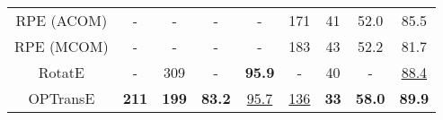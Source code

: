 \documentclass[11pt,a4paper]{article}
\begin{document}
\begin{table*}[t]
\begin{tabular}{|c|c|c|c|c|c|c|c|c|}
RPE (ACOM)                                       & -         & -             & -         & -             & 171         & 41             & 52.0         & 85.5             \\
RPE (MCOM)                                       & -         & -             & -         & -             & 183         & 43             & 52.2         & 81.7             \\
RotatE      & -         & 309             & -         & \bf95.9  
& -         & 40             & -         & \underline{88.4}                                \\
\hline
OPTransE                                   & \bf211         & \bf199             & \bf83.2         & \underline{95.7}             & \underline{136}         & \bf33              & \bf58.0         & \bf89.9            \\
\hline
\end{tabular}
\end{table*}
\end{document}
